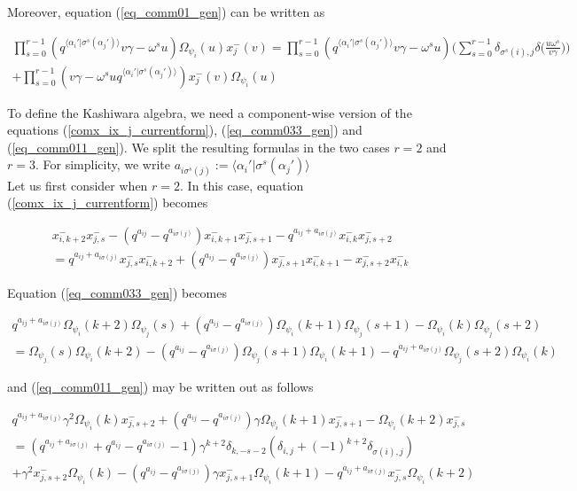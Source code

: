 \documentclass[12pt]{amsart}
\numberwithin{equation}{section}
\begin{document}
Moreover, equation (\ref{eq_comm01_gen}) can be written as

\begin{multline}\label{eq_comm011_gen}
    \prod_{s=0}^{r-1}(q^{\langle \alpha_i' | \sigma^s(\alpha_j') \rangle}v\gamma - \omega^s u) \Omega_{\psi_i}(u)x_j^{-}(v) = \prod_{s=0}^{r-1}(q^{\langle \alpha_i' | \sigma^s(\alpha_j') \rangle}v\gamma - \omega^s u)\Big(\sum_{s=0}^{r-1}\delta_{\sigma^s(i),j}\delta\Big(\frac{u\omega^s}{v\gamma}\Big)\Big) \\
    + \prod_{s=0}^{r-1}(v\gamma - \omega^s u q^{\langle \alpha_i' | \sigma^s(\alpha_j') \rangle})x_j^{-}(v)\Omega_{\psi_i}(u)
\end{multline}

To define the Kashiwara algebra, we need a component-wise version of the equations (\ref{comx_ix_j_currentform}), (\ref{eq_comm033_gen}) and (\ref{eq_comm011_gen}). We split the resulting formulas in the two cases $r=2$ and $r=3$. For simplicity, we write $a_{i\sigma^s(j)} := \langle \alpha_i' | \sigma^s(\alpha_j')\rangle$\\

Let us first consider when $r=2$. In this case, equation (\ref{comx_ix_j_currentform}) becomes

\begin{multline}\label{Kas_commxx_r2}
    x_{i,k+2}^-x_{j,s}^- - (q^{a_{ij}} - q^{a_{i\sigma(j)}})x_{i,k+1}^-x_{j,s+1}^- - q^{a_{ij} + a_{i\sigma(j)}}x_{i,k}^-x_{j,s+2}^- \\
    = q^{a_{ij} + a_{i\sigma(j)}}x_{j,s}^-x_{i,k+2}^- + (q^{a_{ij}} - q^{a_{i\sigma(j)}})x_{j,s+1}^-x_{i,k+1}^- - x_{j,s+2}^-x_{i,k}^-
\end{multline}



Equation (\ref{eq_comm033_gen}) becomes

\begin{multline}\label{Kas_commOO_r2}
    q^{a_{ij} + a_{i\sigma(j)}}\Omega_{\psi_i}(k+2)\Omega_{\psi_j}(s) + (q^{a_{ij}} - q^{a_{i\sigma(j)}})\Omega_{\psi_i}(k+1)\Omega_{\psi_j}(s+1) - \Omega_{\psi_i}(k)\Omega_{\psi_j}(s+2)\\
= \Omega_{\psi_j}(s)\Omega_{\psi_i}(k+2) - (q^{a_{ij}} - q^{a_{i\sigma(j)}})\Omega_{\psi_j}(s+1)\Omega_{\psi_i}(k+1) - q^{a_{ij} + a_{i\sigma(j)}}\Omega_{\psi_j}(s+2)\Omega_{\psi_i}(k)
\end{multline}

and (\ref{eq_comm011_gen}) may be written out as follows

\begin{multline}\label{Kas_commxO_r2}
    q^{a_{ij} + a_{i\sigma(j)}}\gamma^2\Omega_{\psi_i}(k)x_{j,s+2}^- + (q^{a_{ij}} - q^{a_{i\sigma(j)}})\gamma\Omega_{\psi_i}(k+1)x_{j,s+1}^- - \Omega_{\psi_i}(k+2)x_{j,s}^-\\
= (q^{a_{ij} + a_{i\sigma(j)}} + q^{a_{ij}} - q^{a_{i\sigma(j)}} - 1)\gamma^{k+2}\delta_{k,-s-2}(\delta_{i,j} + (-1)^{k+2}\delta_{\sigma(i),j})  \\
+\gamma^2x_{j,s+2}^-\Omega_{\psi_i}(k) - (q^{a_{ij}} - q^{a_{i\sigma(j)}})\gamma x_{j,s+1}^-\Omega_{\psi_i}(k+1) - q^{a_{ij} + a_{i\sigma(j)}}x_{j,s}^-\Omega_{\psi_i}(k+2)
\end{multline}
\end{document}
